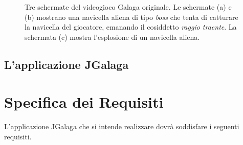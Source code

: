 \documentclass[12pt,a4paper]{report}
\begin{document}
\begin{figure}[bt]
\begin{subfigure}{.32\textwidth}
  \caption{}
  \label{fig:snap3}
\end{subfigure}
\caption{Tre schermate del videogioco Galaga originale. Le schermate (a) e (b) mostrano una navicella aliena di tipo \emph{boss} che tenta di catturare la navicella del giocatore, emanando il cosiddetto \emph{raggio traente}. La schermata (c) mostra l'esplosione di un navicella aliena.}
\label{fig:fig}
\end{figure}


\section{L'applicazione JGalaga}\label{se:appjgal}
\lipsum[3-8]



\chapter{Specifica dei Requisiti}\label{ch:spereq}

L'applicazione JGalaga che si intende realizzare dovrà soddisfare i seguenti requisiti.
\end{document}
